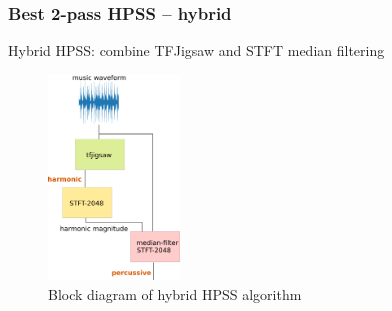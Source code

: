 \documentclass{beamer}
\begin{document}
\begin{frame}
	\frametitle{Best 2-pass HPSS -- hybrid}
	Hybrid HPSS: combine TFJigsaw and STFT median filtering
	\begin{figure}[ht]
		\vspace{-0.5em}
		\includegraphics[width=3.5cm]{./hybrid_hpss_block_diagram.png}
		\caption{Block diagram of hybrid HPSS algorithm}
		\vspace{-0.75em}
	\end{figure}
\end{frame}

\begin{frame}
	\hfill
\end{frame}
\end{document}
